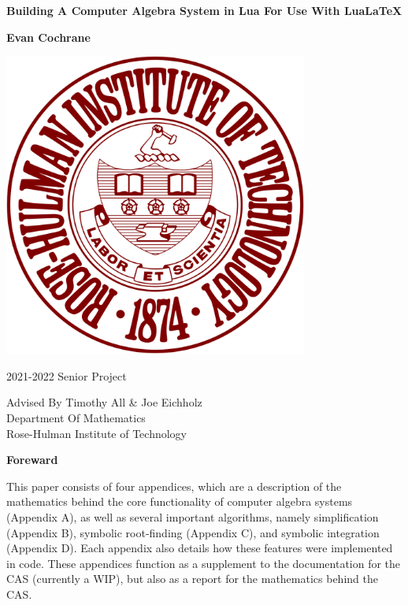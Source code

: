\documentclass{article}
\theoremstyle{definition}
\begin{document}
\begin{titlepage}
   \begin{center}
       \vspace*{1cm}

       {\Huge \textbf{Building A Computer Algebra System in Lua For Use With Lua\LaTeX{}}}
            
       \vspace{1.5cm}

       \textbf{Evan Cochrane}
       \vfill
       
       \includegraphics[width=0.75\textwidth]{rose.png}

       \vfill
            
       2021-2022 Senior Project\\
            
       \vspace{0.8cm}
       
       Advised By Timothy All \& Joe Eichholz\\
       Department Of Mathematics\\
       Rose-Hulman Institute of Technology\\
            
   \end{center}
\end{titlepage}

\vspace*{\fill}
    
\begin{center}
    \textbf{Foreward}
\end{center}
    This paper consists of four appendices, which are a description of the mathematics behind the core functionality of computer algebra systems (Appendix A), as well as several important algorithms, namely simplification (Appendix B), symbolic root-finding (Appendix C), and symbolic integration (Appendix D). Each appendix also details how these features were implemented in code. These appendices function as a supplement to the documentation for the CAS (currently a WIP), but also as a report for the mathematics behind the CAS.
\vspace*{\fill}
\end{document}
